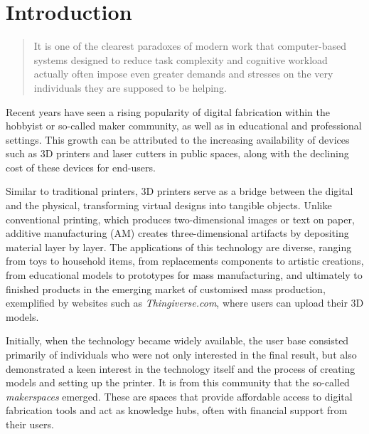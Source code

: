 \chapter{Introduction}\label{ch:intro}

\begin{quote}
    \small
    It is one of the clearest paradoxes of modern work that computer-based systems designed to reduce task complexity and cognitive workload actually often impose even greater demands and stresses on the very individuals they are supposed to be helping.\cite[p.~222]{jacko_human_2012}
\end{quote}

Recent years have seen a rising popularity of digital fabrication within the hobbyist or so-called maker community, as well as in educational and professional settings. 
This growth can be attributed to the increasing availability of devices such as 3D printers and laser cutters in public spaces, along with the declining cost of these devices for end-users.\cite{yan_make_2025} 

Similar to traditional printers, 3D printers serve as a bridge between the digital and the physical, transforming virtual designs into tangible objects. 
Unlike conventional printing, which produces two-dimensional images or text on paper, additive manufacturing (AM) creates three-dimensional artifacts by depositing material layer by layer.\cite{landwehr_sydow_machine_2020} 
The applications of this technology are diverse, ranging from toys to household items, from replacements components to artistic creations, from educational models to prototypes for mass manufacturing, and ultimately to finished products in the emerging market of customised mass production, exemplified by websites such as \textit{Thingiverse.com}, where users can upload their 3D models. 

Initially, when the technology became widely available, the user base consisted primarily of individuals who were not only interested in the final result, but also demonstrated a keen interest in the technology itself and the process of creating models and setting up the printer. 
It is from this community that the so-called \textit{makerspaces} emerged.
These are spaces that provide affordable access to digital fabrication tools and act as knowledge hubs, often with financial support from their users.\cite{hudson_understanding_2016}

